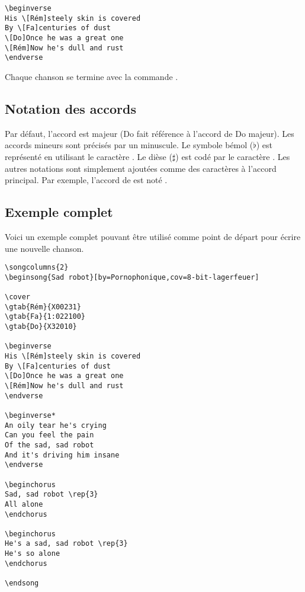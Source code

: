 \documentclass[versionenligne]{framabook}
\begin{document}
\begin{center}
\begin{verbatim}
\beginverse
His \[Rém]steely skin is covered
By \[Fa]centuries of dust
\[Do]Once he was a great one
\[Rém]Now he's dull and rust
\endverse
\end{verbatim}
\end{center}

Chaque chanson se termine avec la commande .

\subsection{Notation des accords}\label{sect:about}

Par défaut, l'accord est majeur (Do fait référence à l'accord de Do
majeur). Les accords mineurs sont précisés par un  minuscule.  Le
symbole bémol ($\flat$) est représenté en utilisant le caractère \command{\&}.  Le
dièse ($\sharp$) est codé par le caractère \command{\#}. Les autres notations sont
simplement ajoutées comme des caractères à l'accord principal. Par
exemple, l'accord de  est noté \latexcom{[La\&m]}.


\subsection{Exemple complet}

Voici un exemple complet pouvant être utilisé comme point de départ
pour écrire une nouvelle chanson.

\begin{verbatim}
\songcolumns{2}
\beginsong{Sad robot}[by=Pornophonique,cov=8-bit-lagerfeuer]

\cover
\gtab{Rém}{X00231}
\gtab{Fa}{1:022100}
\gtab{Do}{X32010}

\beginverse
His \[Rém]steely skin is covered
By \[Fa]centuries of dust
\[Do]Once he was a great one
\[Rém]Now he's dull and rust
\endverse

\beginverse*
An oily tear he's crying
Can you feel the pain
Of the sad, sad robot
And it's driving him insane
\endverse

\beginchorus
Sad, sad robot \rep{3}
All alone
\endchorus

\beginchorus
He's a sad, sad robot \rep{3}
He's so alone
\endchorus

\endsong
\end{verbatim}
\end{document}
